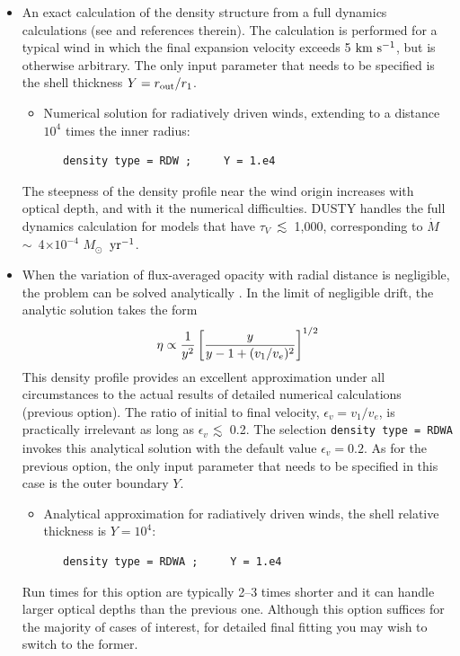 \documentclass[11pt]{article}
\def\E#1{\hbox{$10^{#1}$}}
\def\eq#1{\begin{equation} #1 \end{equation}}
\def\about  {\hbox{$\sim$}}
\def\la    {\hbox{$\mathrel{\hbox{\raise.3ex\hbox{$<$}\llap
                                {\lower.8ex\hbox{$\sim$}}}}$}}
\def\x      {\hbox{$\times$}}
\def\tV     {\hbox{$\tau_V$}}
\def\Mo     {\hbox{$M_{\odot}$}}
\def\Mdot   {\hbox{$\dot{M}$}}
\def\kms    {\hbox{$\rm km\ s^{-1}$}}
\begin{document}
\begin{itemize}
\item An exact calculation of the density structure from a full
  dynamics calculations (see \cite{IE95,EI01} and references therein).
  The calculation is performed for a typical wind in which the final
  expansion velocity exceeds 5 \kms, but is otherwise arbitrary. The
  only input parameter that needs to be specified is the shell
  thickness $Y = r_{\rm out}/r_1$.

  \begin{itemize}
  \item Numerical solution for radiatively driven winds, extending to
    a distance $10^4$ times the inner radius:

\begin{verbatim}
   density type = RDW ;     Y = 1.e4
\end{verbatim}
  \end{itemize}
  The steepness of the density profile near the wind origin increases
  with optical depth, and with it the numerical difficulties.  DUSTY
  handles the full dynamics calculation for models that have \tV\ \la\
  1,000, corresponding to \Mdot\ \about\ 4\x\E{-4} \Mo\ $\rm yr^{-1}$.

\item When the variation of flux-averaged opacity with radial distance
  is negligible, the problem can be solved analytically \cite{EI01}.
  In the limit of negligible drift, the analytic solution takes the
  form \eq{ \eta \propto {1\over y^2}\left[{y \over y - 1 +
        (v_1/v_e)^2}\right]^{1/2} } This density profile provides an
  excellent approximation under all circumstances to the actual
  results of detailed numerical calculations (previous option). The
  ratio of initial to final velocity, $\epsilon_v = v_1/v_e$, is
  practically irrelevant as long as $\epsilon_v$ \la\ 0.2. The
  selection {\tt density type = RDWA} invokes this analytical
  solution with the default value $\epsilon_v = 0.2$. As for the
  previous option, the only input parameter that needs to be specified
  in this case is the outer boundary $Y$.

  \begin{itemize}
  \item Analytical approximation for radiatively driven winds, the
    shell relative thickness is $Y = 10^4$:

\begin{verbatim}
   density type = RDWA ;     Y = 1.e4
\end{verbatim}

\end{itemize}
Run times for this option are typically 2--3 times shorter and it can
handle larger optical depths than the previous one. Although this
option suffices for the majority of cases of interest, for detailed
final fitting you may wish to switch to the former.

\end{itemize}
\end{document}
